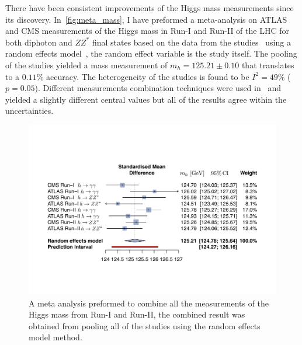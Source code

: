 There have been consistent improvements of the Higgs mass measurements since its discovery. In~\autoref{fig:meta_mass}, I have preformed a meta-analysis on ATLAS and CMS measurements of the Higgs mass in Run-I and Run-II of the LHC for both diphoton and $ZZ^*$ final states based on the data from the studies~\cite{ATLAS:2015yey,ATLAS:2018tdk,CMS:2017dib,CMS:2020xrn} using a random effects model~\cite{aronow_miller_2019}, the random effect variable is the study itself. The pooling of the studies yielded a mass measurement of $ m_h = 125.21 \pm 0.10$ that translates to a $0.11\%$ accuracy. The heterogeneity of the studies is found to be $I^2 =49\%$ ($p=0.05$). Different measurements combination techniques were used in~\cite{CMS:2020xrn} and~\cite{Zyla:2020zbs} yielded a slightly different central values but all of the results agree within the uncertainties. 
\begin{figure}[h!]
	\begin{center}
		\includegraphics[width=1.\textwidth]{figures/foreest_pllot_higgs_mass}
		\caption{A meta analysis preformed to combine all the measurements of the Higgs mass from Run-I and Run-II, the combined result was obtained from pooling all of the studies using the random effects model method.\label{fig:meta_mass} }
	\end{center}
\end{figure}
